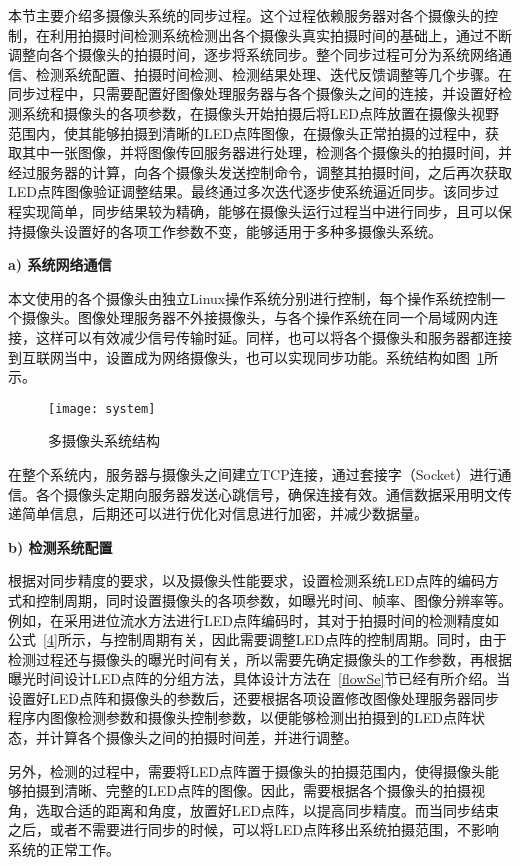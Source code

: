 本节主要介绍多摄像头系统的同步过程。这个过程依赖服务器对各个摄像头的控制，在利用拍摄时间检测系统检测出各个摄像头真实拍摄时间的基础上，通过不断调整向各个摄像头的拍摄时间，逐步将系统同步。整个同步过程可分为系统网络通信、检测系统配置、拍摄时间检测、检测结果处理、迭代反馈调整等几个步骤。在同步过程中，只需要配置好图像处理服务器与各个摄像头之间的连接，并设置好检测系统和摄像头的各项参数，在摄像头开始拍摄后将LED点阵放置在摄像头视野范围内，使其能够拍摄到清晰的LED点阵图像，在摄像头正常拍摄的过程中，获取其中一张图像，并将图像传回服务器进行处理，检测各个摄像头的拍摄时间，并经过服务器的计算，向各个摄像头发送控制命令，调整其拍摄时间，之后再次获取LED点阵图像验证调整结果。最终通过多次迭代逐步使系统逼近同步。该同步过程实现简单，同步结果较为精确，能够在摄像头运行过程当中进行同步，且可以保持摄像头设置好的各项工作参数不变，能够适用于多种多摄像头系统。

\textbf{a) 系统网络通信}

本文使用的各个摄像头由独立Linux操作系统分别进行控制，每个操作系统控制一个摄像头。图像处理服务器不外接摄像头，与各个操作系统在同一个局域网内连接，这样可以有效减少信号传输时延。同样，也可以将各个摄像头和服务器都连接到互联网当中，设置成为网络摄像头，也可以实现同步功能。系统结构如图~\ref{system}所示。

\begin{figure}[h] 
  \centering
  \texttt{[image: system]}
  \caption{多摄像头系统结构}
    \label{system}
\end{figure}

在整个系统内，服务器与摄像头之间建立TCP连接，通过套接字（Socket）进行通信。各个摄像头定期向服务器发送心跳信号，确保连接有效。通信数据采用明文传递简单信息，后期还可以进行优化对信息进行加密，并减少数据量。

\textbf{b) 检测系统配置}

根据对同步精度的要求，以及摄像头性能要求，设置检测系统LED点阵的编码方式和控制周期，同时设置摄像头的各项参数，如曝光时间、帧率、图像分辨率等。例如，在采用进位流水方法进行LED点阵编码时，其对于拍摄时间的检测精度如公式~\ref{4}所示，与控制周期有关，因此需要调整LED点阵的控制周期。同时，由于检测过程还与摄像头的曝光时间有关，所以需要先确定摄像头的工作参数，再根据曝光时间设计LED点阵的分组方法，具体设计方法在~\ref{flowSe}节已经有所介绍。当设置好LED点阵和摄像头的参数后，还要根据各项设置修改图像处理服务器同步程序内图像检测参数和摄像头控制参数，以便能够检测出拍摄到的LED点阵状态，并计算各个摄像头之间的拍摄时间差，并进行调整。

另外，检测的过程中，需要将LED点阵置于摄像头的拍摄范围内，使得摄像头能够拍摄到清晰、完整的LED点阵的图像。因此，需要根据各个摄像头的拍摄视角，选取合适的距离和角度，放置好LED点阵，以提高同步精度。而当同步结束之后，或者不需要进行同步的时候，可以将LED点阵移出系统拍摄范围，不影响系统的正常工作。

